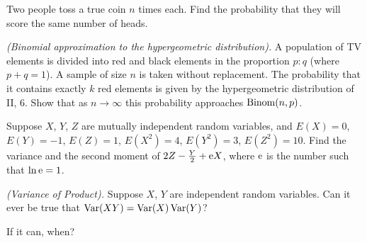 \begin{problem}[Handout 8, \# 15]
  Two people toss a true coin \(n\) times each. Find the probability that
  they will score the same number of heads.
\end{problem}
\begin{solution}
\end{solution}

\begin{problem}[Handout 8, \# 16]
  \emph{(Binomial approximation to the hypergeometric distribution).} A
  population of TV elements is divided into red and black elements in the
  proportion \(p:q\) (where \(p+q=1\)). A sample of size \(n\) is taken
  without replacement. The probability that it contains exactly \(k\) red
  elements is given by the hypergeometric distribution of II, 6. Show that
  as \(n\to\infty\) this probability approaches \(\operatorname{Binom}(n,p)\).
\end{problem}
\begin{solution}
\end{solution}

\begin{problem}[Handout 9, \# 3]
  Suppose \(X\), \(Y\), \(Z\) are mutually independent random variables,
  and \(E(X)=0\), \(E(Y)=-1\), \(E(Z)=1\), \(E(X^2)=4\), \(E(Y^2)=3\),
  \(E(Z^2)=10\). Find the variance and the second moment of
  \(2Z-\frac{Y}{2}+\mathrm{e} X\), where \(\mathrm{e}\) is the number such that
  \(\ln \mathrm{e}=1\).
\end{problem}
\begin{solution}
\end{solution}

\begin{problem}[Handout 9, \# 14]
  \emph{(Variance of Product).} Suppose \(X\), \(Y\) are independent
  random variables. Can it ever be true that \(\operatorname{Var}(XY)=\operatorname{Var}(X)\operatorname{Var}(Y)\)?

  \noindent If it can, when?
\end{problem}
\begin{solution}
\end{solution}

